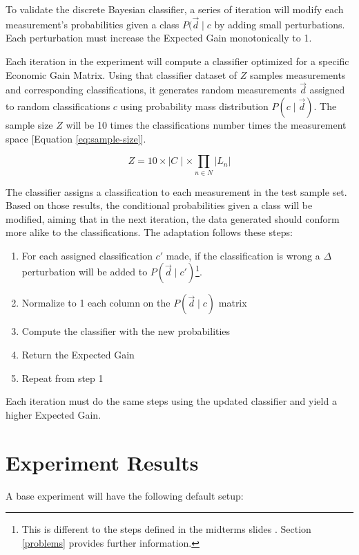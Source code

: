 \documentclass[letterpaper, conference]{IEEEtran}
\begin{document}
To validate the discrete Bayesian classifier, a series of iteration will modify each measurement's probabilities given a class $P(\vec{d} \mid c$ by adding small perturbations. Each perturbation must increase the Expected Gain monotonically to 1.

Each iteration in the experiment will compute a classifier optimized for a specific Economic Gain Matrix. Using that classifier dataset of $Z$ samples measurements and corresponding classifications, it generates random measurements $\vec{d}$ assigned to random classifications $c$ using probability mass distribution $P(c \mid \vec{d})$. The sample size $Z$ will be 10 times the classifications number times the measurement space [Equation \ref{eq:sample-size}].

\begin{equation}\label{eq:sample-size}
  Z = 10 \times \mid C \mid \times \prod_{n \in N} |L_n|
\end{equation}

The classifier assigns a classification to each measurement in the test sample set. Based on those results, the conditional probabilities given a class will be modified, aiming that in the next iteration, the data generated should conform more alike to the classifications. The adaptation follows these steps:

\begin{enumerate}
  \item For each assigned classification $c'$ made, if the classification is wrong a $\Delta$ perturbation will be added to $P(\vec{d} \mid c')$\footnote{This is different to the steps defined in the midterms slides \cite{midterm-project}. Section \ref{problems} provides further information.}.
  \item Normalize to 1 each column on the $P(\vec{d} \mid c)$ matrix
  \item Compute the classifier with the new probabilities
  \item Return the Expected Gain
  \item Repeat from step 1
\end{enumerate}

Each iteration must do the same steps using the updated classifier and yield a higher Expected Gain.

\section{Experiment Results}

A base experiment will have the following default setup:
\end{document}
